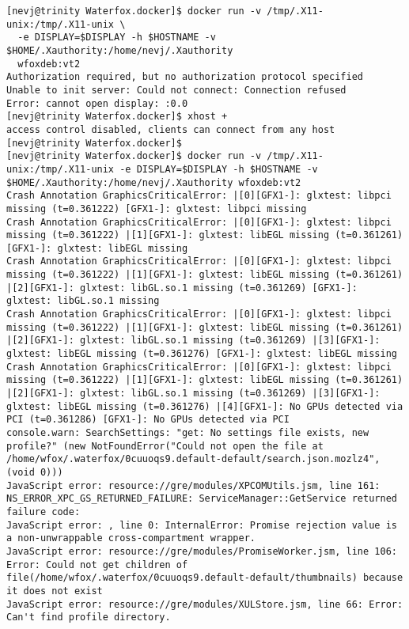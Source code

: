 \documentclass[a4paper]{article}  %
\begin{document}
\begin{tcolorbox}
\begin{verbatim}
[nevj@trinity Waterfox.docker]$ docker run -v /tmp/.X11-unix:/tmp/.X11-unix \
  -e DISPLAY=$DISPLAY -h $HOSTNAME -v $HOME/.Xauthority:/home/nevj/.Xauthority 
  wfoxdeb:vt2
Authorization required, but no authorization protocol specified
Unable to init server: Could not connect: Connection refused
Error: cannot open display: :0.0
[nevj@trinity Waterfox.docker]$ xhost +
access control disabled, clients can connect from any host
[nevj@trinity Waterfox.docker]$ 
[nevj@trinity Waterfox.docker]$ docker run -v /tmp/.X11-unix:/tmp/.X11-unix -e DISPLAY=$DISPLAY -h $HOSTNAME -v $HOME/.Xauthority:/home/nevj/.Xauthority wfoxdeb:vt2
Crash Annotation GraphicsCriticalError: |[0][GFX1-]: glxtest: libpci missing (t=0.361222) [GFX1-]: glxtest: libpci missing
Crash Annotation GraphicsCriticalError: |[0][GFX1-]: glxtest: libpci missing (t=0.361222) |[1][GFX1-]: glxtest: libEGL missing (t=0.361261) [GFX1-]: glxtest: libEGL missing
Crash Annotation GraphicsCriticalError: |[0][GFX1-]: glxtest: libpci missing (t=0.361222) |[1][GFX1-]: glxtest: libEGL missing (t=0.361261) |[2][GFX1-]: glxtest: libGL.so.1 missing (t=0.361269) [GFX1-]: glxtest: libGL.so.1 missing
Crash Annotation GraphicsCriticalError: |[0][GFX1-]: glxtest: libpci missing (t=0.361222) |[1][GFX1-]: glxtest: libEGL missing (t=0.361261) |[2][GFX1-]: glxtest: libGL.so.1 missing (t=0.361269) |[3][GFX1-]: glxtest: libEGL missing (t=0.361276) [GFX1-]: glxtest: libEGL missing
Crash Annotation GraphicsCriticalError: |[0][GFX1-]: glxtest: libpci missing (t=0.361222) |[1][GFX1-]: glxtest: libEGL missing (t=0.361261) |[2][GFX1-]: glxtest: libGL.so.1 missing (t=0.361269) |[3][GFX1-]: glxtest: libEGL missing (t=0.361276) |[4][GFX1-]: No GPUs detected via PCI (t=0.361286) [GFX1-]: No GPUs detected via PCI
console.warn: SearchSettings: "get: No settings file exists, new profile?" (new NotFoundError("Could not open the file at /home/wfox/.waterfox/0cuuoqs9.default-default/search.json.mozlz4", (void 0)))
JavaScript error: resource://gre/modules/XPCOMUtils.jsm, line 161: NS_ERROR_XPC_GS_RETURNED_FAILURE: ServiceManager::GetService returned failure code:
JavaScript error: , line 0: InternalError: Promise rejection value is a non-unwrappable cross-compartment wrapper.
JavaScript error: resource://gre/modules/PromiseWorker.jsm, line 106: Error: Could not get children of file(/home/wfox/.waterfox/0cuuoqs9.default-default/thumbnails) because it does not exist
JavaScript error: resource://gre/modules/XULStore.jsm, line 66: Error: Can't find profile directory.

\end{verbatim}
\end{tcolorbox}
\end{document}

